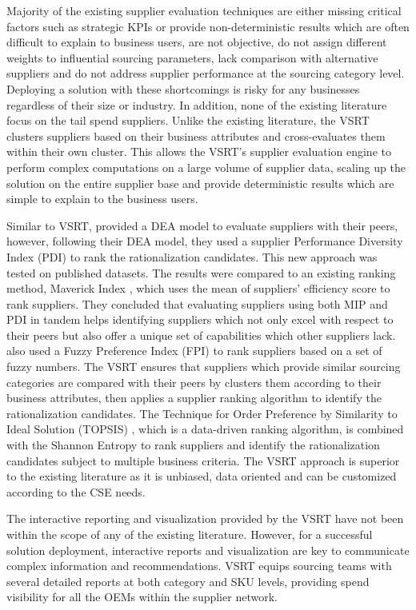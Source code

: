 \documentclass[inte,nonblindrev]{informs3} %
\begin{document}
Majority of the existing supplier evaluation techniques are either missing critical factors such as strategic KPIs or provide non-deterministic results which are often difficult to explain to business users, are not objective, do not assign different weights to influential sourcing parameters, lack comparison with alternative suppliers and do not address supplier performance at the sourcing category level. Deploying a solution with these shortcomings is risky for any businesses regardless of their size or industry. In addition, none of the existing literature focus on the tail spend suppliers. Unlike the existing literature, the VSRT clusters suppliers based on their business attributes and cross-evaluates them within their own cluster. This allows the VSRT's supplier evaluation engine to perform complex computations on a large volume of supplier data, scaling up the solution on the entire supplier base and provide deterministic results which are simple to explain to the business users.

Similar to VSRT, \cite{r33} provided a DEA model to evaluate suppliers with their peers, however, following their DEA model, they used a supplier Performance Diversity Index (PDI) to rank the rationalization candidates. This new approach was tested on published datasets. The results were compared to an existing ranking method, Maverick Index \citep{r21}, which uses the mean of suppliers' efficiency score to rank suppliers. They concluded that evaluating suppliers using both MIP and PDI in tandem helps identifying suppliers which not only excel with respect to their peers but also offer a unique set of capabilities which other suppliers lack. \cite{r30} also used a Fuzzy Preference Index (FPI) \citep{r36} to rank suppliers based on a set of fuzzy numbers. The VSRT ensures that suppliers which provide similar sourcing categories are compared with their peers by clusters them according to their business attributes, then applies a supplier ranking algorithm to identify the rationalization candidates. The Technique for Order Preference by Similarity to Ideal Solution (TOPSIS) \citep{r4}, which is a data-driven ranking algorithm, is combined with the Shannon Entropy \citep{r6} to rank suppliers and identify the rationalization candidates subject to multiple business criteria. The VSRT approach is superior to the existing literature as it is unbiased, data oriented and can be customized according to the CSE needs. 

The interactive reporting and visualization provided by the VSRT have not been within the scope of any of the existing literature. However, for a successful solution deployment, interactive reports and visualization are key to communicate complex information and recommendations. VSRT equips sourcing teams with several detailed reports at both category and SKU levels, providing spend visibility for all the OEMs within the supplier network. 
\end{document}
